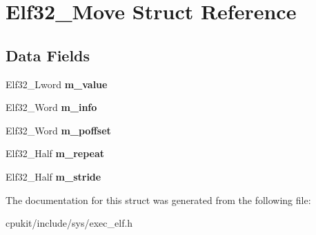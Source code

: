 \hypertarget{structElf32__Move}{}\section{Elf32\+\_\+\+Move Struct Reference}
\label{structElf32__Move}
\subsection*{Data Fields}
\begin{DoxyCompactItemize}
\item 
\mbox{\label{structElf32__Move_a11ef0924032559a925893490fae974ab}} 
Elf32\+\_\+\+Lword {\bfseries m\+\_\+value}
\item 
\mbox{\label{structElf32__Move_a25c402d8b1991f61f6ecc539368cd99a}} 
Elf32\+\_\+\+Word {\bfseries m\+\_\+info}
\item 
\mbox{\label{structElf32__Move_a4b1119df05b7672effd0afb09b258f85}} 
Elf32\+\_\+\+Word {\bfseries m\+\_\+poffset}
\item 
\mbox{\label{structElf32__Move_a84620f9a22f6a4b0f8a8a6c4e332f600}} 
Elf32\+\_\+\+Half {\bfseries m\+\_\+repeat}
\item 
\mbox{\label{structElf32__Move_a85ca12bb9ac30146a8533fccfe601b43}} 
Elf32\+\_\+\+Half {\bfseries m\+\_\+stride}
\end{DoxyCompactItemize}


The documentation for this struct was generated from the following file\+:\begin{DoxyCompactItemize}
\item 
cpukit/include/sys/exec\+\_\+elf.\+h\end{DoxyCompactItemize}
